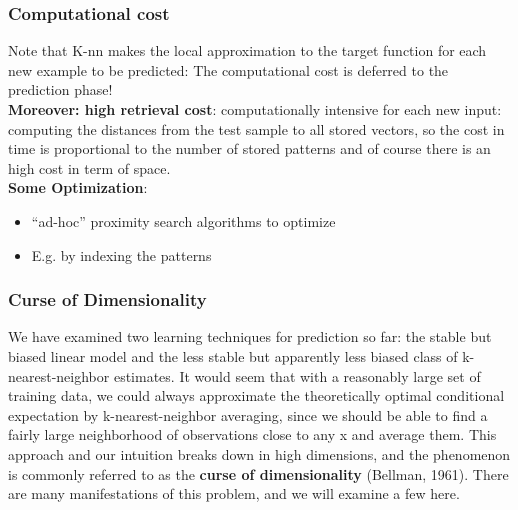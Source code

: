 \documentclass[../main.tex]{subfiles}
\begin{document}
\subsubsection{Computational cost}
Note that K-nn makes the local approximation to the target function for each new example to be predicted: The computational cost is deferred to the prediction phase!\\

\textbf{Moreover: high retrieval cost}:
computationally intensive for each new input: computing the distances from the test sample to all stored vectors, so the cost in time is proportional to the number of stored patterns and of course there is an high cost in term of space.\\

\textbf{Some Optimization}:
\begin{itemize}
    \item “ad-hoc” proximity search algorithms to optimize
    \item E.g. by indexing the patterns
\end{itemize}

\subsubsection{Curse of Dimensionality}
We have examined two learning techniques for prediction so far: the stable but biased linear model and the less stable but apparently less biased class of k-nearest-neighbor estimates. It would seem that with a reasonably large set of training data, we could always approximate the theoretically optimal conditional expectation by k-nearest-neighbor averaging, since we should be able to find a fairly large neighborhood of observations close to any x and average them. This approach and our intuition breaks down in high dimensions, and the phenomenon is commonly referred to as the \textbf{curse of dimensionality} (Bellman, 1961). There are many manifestations of this problem, and we will examine a few here.
\end{document}
